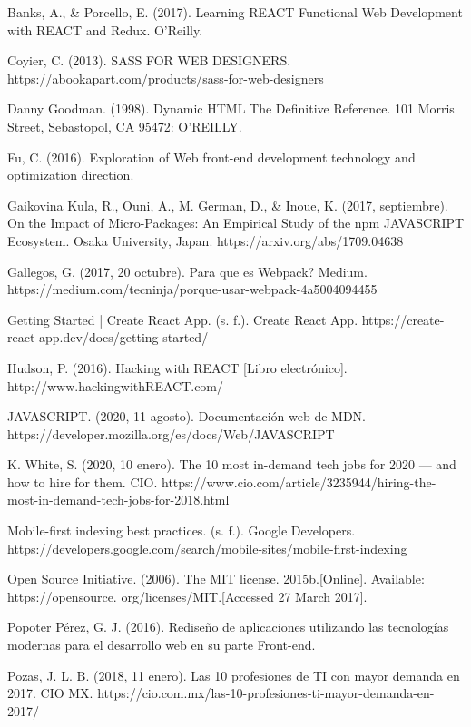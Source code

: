 \begin{thebibliography}{100} 

\bibitem{} Banks, A., & Porcello, E. (2017). Learning REACT Functional Web Development with REACT and Redux. O’Reilly.

\bibitem{} Coyier, C. (2013). SASS FOR WEB DESIGNERS. https://abookapart.com/products/sass-for-web-designers

\bibitem{} Danny Goodman. (1998). Dynamic HTML The Definitive Reference. 101 Morris Street, Sebastopol, CA 95472: O'REILLY.

\bibitem{} Fu, C. (2016). Exploration of Web front-end development technology and optimization direction.

\bibitem{} Gaikovina Kula, R., Ouni, A., M. German, D., & Inoue, K. (2017, septiembre). On the Impact of Micro-Packages: An Empirical Study of the npm JAVASCRIPT Ecosystem. Osaka University, Japan. https://arxiv.org/abs/1709.04638

\bibitem{} Gallegos, G. (2017, 20 octubre). Para que es Webpack? Medium. https://medium.com/tecninja/porque-usar-webpack-4a5004094455

 Getting Started | Create React App. (s. f.). Create React App. https://create-react-app.dev/docs/getting-started/

\bibitem{} Hudson, P. (2016). Hacking with REACT [Libro electrónico]. http://www.hackingwithREACT.com/

\bibitem{} JAVASCRIPT. (2020, 11 agosto). Documentación web de MDN. https://developer.mozilla.org/es/docs/Web/JAVASCRIPT

\bibitem{} K. White, S. (2020, 10 enero). The 10 most in-demand tech jobs for 2020 — and how to hire for them. CIO. https://www.cio.com/article/3235944/hiring-the-most-in-demand-tech-jobs-for-2018.html

\bibitem{} Mobile-first indexing best practices. (s. f.). Google Developers. https://developers.google.com/search/mobile-sites/mobile-first-indexing


\bibitem{} Open Source Initiative. (2006). The MIT license. 2015b.[Online]. Available: https://opensource. org/licenses/MIT.[Accessed 27 March 2017].


\bibitem{} Popoter Pérez, G. J. (2016). Rediseño de aplicaciones utilizando las tecnologías modernas para el desarrollo web en su parte Front-end.


\bibitem{} Pozas, J. L. B. (2018, 11 enero). Las 10 profesiones de TI con mayor demanda en 2017. CIO MX. https://cio.com.mx/las-10-profesiones-ti-mayor-demanda-en-2017/


\end{thebibliography}
